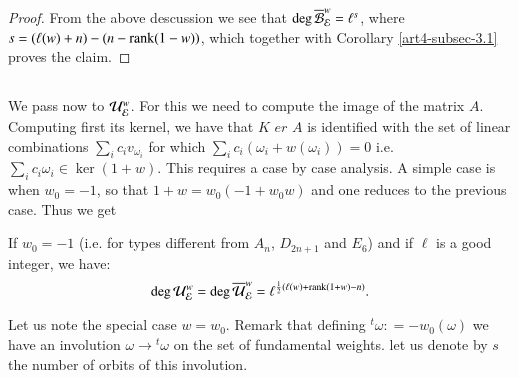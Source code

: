 \begin{proof}
From the above descussion we see that $\deg\overline{\mathcal{B}}_{\mathcal{E}}^{w} = \ell^{s}$, where $s = (\ell(w) +n) -(n -\operatorname{rank}(1-w))$, which together with Corollary \ref{art4-subsec-3.1} proves the claim.
\end{proof}

\subsection{}\label{art4-subsec-3.5}
We pass now to $\mathcal{U}_{\mathcal{E}}^{w}$. For this we need to compute the image of the matrix $A$. Computing first its kernel, we have that $K$ $er$ $A$ is identified with the set of linear combinations $\sum_{i}c_{i}v_{\omega_{i}}$ for which $\sum_{i}c_{i}(\omega_{i}+w(\omega_{i}))=0$ i.e. $\sum_{i}c_{i}\omega_{i}\in \ker(1 + w)$. This requires a case by case analysis. A simple case is when $w_{0} = -1$, so that $1+w = w_{0}(-1 + w_{0}w)$ and one reduces to the previous case. Thus we get

\begin{prop*}
If $w_{0} =-1$ (i.e. for types different from $A_{n}$, $D_{2n+1}$ and $E_{6}$) and if $\ell$ is a good integer, we have:
$$
\deg\mathcal{U}_{\mathcal{E}}^{w} = \deg\overline{\mathcal{U}}_{\mathcal{E}}^{w} = \ell^{\frac{1}{2}(\ell(w)+\operatorname{rank}(1+w)-n)}.
$$
\end{prop*}

Let us note the special case $w=w_{0}$. Remark that defining ${}^{t}\omega : = -w_{0}(\omega)$ we have an involution $\omega \rightarrow {}^{t}\omega$ on the set of fundamental weights. let us denote by $s$ the number of orbits of this involution.
